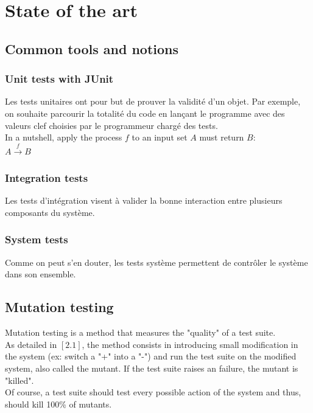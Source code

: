 \documentclass[a4paper]{report}
\begin{document}
\chapter*{State of the art}


\section*{Common tools and notions}

\subsection*{Unit tests with JUnit}
Les tests unitaires ont pour but de prouver la validité d'un objet. Par exemple, on souhaite parcourir la totalité du code en lançant le programme avec des valeurs clef choisies par le programmeur chargé des tests.\\
In a nutshell, apply the process $f$ to an input set $A$ must return $B$:\\
$ A \xrightarrow{f} B $

\subsection*{Integration tests}
Les tests d'intégration visent à valider la bonne interaction entre plusieurs composants du système.

\subsection*{System tests}
Comme on peut s'en douter, les tests système permettent de contrôler le système dans son ensemble.


\section*{Mutation testing}
Mutation testing is a method that measures the "quality" of a test suite.\\
As detailed in $[2.1]$, the method consists in introducing small modification in the system (ex: switch a "+" into a "-") and run the test suite on the modified system, also called the mutant. If the test suite raises an failure, the mutant is "killed".\\
Of course, a test suite should test every possible action of the system and thus, should kill 100\% of mutants.
\end{document}
